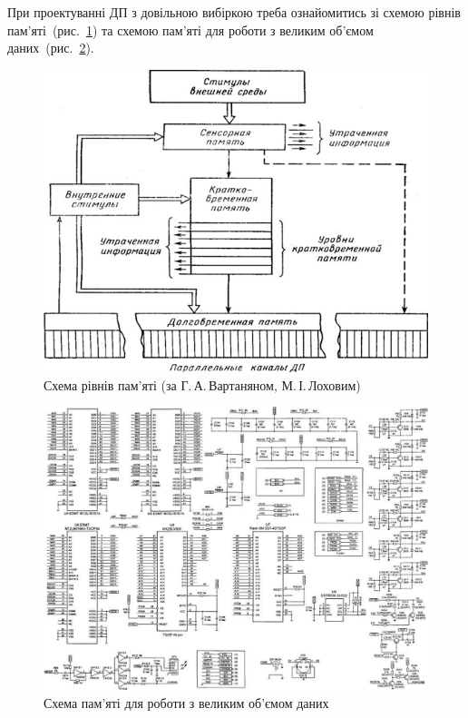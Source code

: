 \documentclass[a4paper, oneside, DIV = 12, 12pt, headings = normal]{scrartcl}
\begin{document}
			При проектуванні ДП з довільною вибіркою треба ознайомитись зі схемою рівнів пам'\-яті~(рис.~\ref{fig:memory-hierarchy}) та схемою пам'\-яті для роботи з великим об'ємом даних~(рис.~\ref{fig:large-data-memory-schematic}).
			\begin{figure}[!htbp]
				\centering
					\includegraphics[height = 12\baselineskip]{./assets/03.png}
				\caption{Схема рівнів пам'\-яті (за Г.\,А.\,Вартаняном, М.\,І.\,Лоховим)}
				\label{fig:memory-hierarchy}
			\end{figure}
			\begin{figure}[!htbp]
				\centering
					\includegraphics[width = \linewidth]{./assets/04.png}
				\caption{Схема пам'\-яті для роботи з великим об'ємом даних} 
				\label{fig:large-data-memory-schematic}
			\end{figure}
\end{document}
